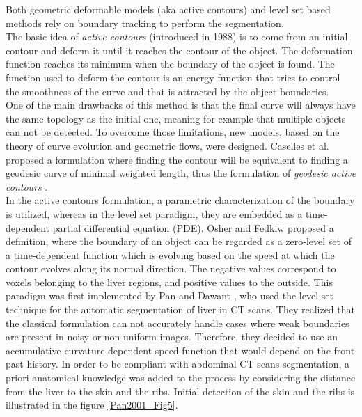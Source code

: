 Both geometric deformable models (aka active contours) and level set
based methods rely on boundary tracking to perform the segmentation.\\
The basic idea of \emph{active contours} (introduced in 1988) is to
come from an initial contour and deform it until it reaches the
contour of the object. The deformation function reaches its minimum when
the boundary of the object is found. The function used to deform the
contour is an energy function that tries to control the smoothness of
the curve and that is attracted by the object boundaries.\\
One of the main drawbacks of this method is that the final curve will
always have the same topology as the initial one, meaning for example
that multiple objects can not be detected. To overcome those limitations,
new models, based on the theory of curve evolution and geometric flows,
were designed.
Caselles et al. \cite{Caselles1997} proposed a formulation where finding the contour will be
equivalent to finding a geodesic curve of minimal weighted length, thus
the formulation of \emph{geodesic active contours} .\\
In the active contours formulation, a parametric characterization of the
boundary is utilized, whereas in the level set paradigm, they are
embedded as a time-dependent partial differential equation (PDE).
Osher and Fedkiw \cite{Osher2003} proposed a definition, where the boundary of an object
can be regarded as a zero-level set of a time-dependent function which
is evolving based on the speed at which the contour evolves along its
normal direction. The negative values correspond to voxels belonging to
the liver regions, and positive values to the outside. This paradigm was
first implemented by
Pan and Dawant \cite{Pan2001}, who used the level set technique for the automatic segmentation of liver
in CT scans. They realized that the classical formulation can not
accurately handle cases where weak boundaries are present in noisy or
non-uniform images. Therefore, they decided to use an accumulative
curvature-dependent speed function that would depend on the front past
history. In order to be compliant with abdominal CT scans segmentation,
a priori anatomical knowledge was added to the process by considering
the distance from the liver to the skin and the ribs. Initial detection
of the skin and the ribs is illustrated in the figure \ref{Pan2001_Fig5}.

